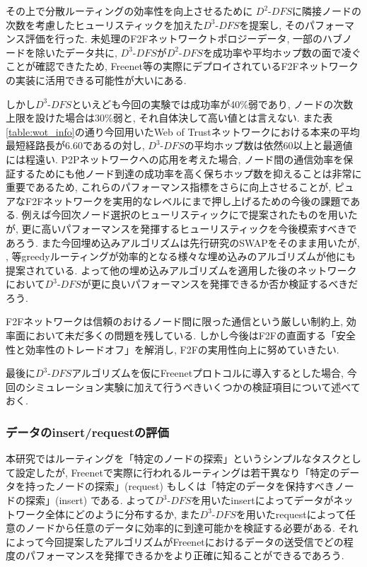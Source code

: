 \documentclass[dvipdfmx]{ampbt}
\begin{document}
その上で分散ルーティングの効率性を向上させるために $D^2$-$DFS$に隣接ノードの次数を考慮したヒューリスティックを加えた$D^3$-$DFS$を提案し, そのパフォーマンス評価を行った. 未処理のF2Fネットワークトポロジーデータ, 一部のハブノードを除いたデータ共に, $D^3$-$DFS$が$D^2$-$DFS$を成功率や平均ホップ数の面で凌ぐことが確認できたため, Freenet等の実際にデプロイされているF2Fネットワークの実装に活用できる可能性が大いにある. 

しかし$D^3$-$DFS$といえども今回の実験では成功率が40\%弱であり, ノードの次数上限を設けた場合は30\%弱と, それ自体決して高い値とは言えない. また表\ref{table:wot_info}の通り今回用いたWeb of Trustネットワークにおける本来の平均最短経路長が6.60であるの対し, $D^3$-$DFS$の平均ホップ数は依然60以上と最適値には程遠い. P2Pネットワークへの応用を考えた場合, ノード間の通信効率を保証するためにも他ノード到達の成功率を高く保ちホップ数を抑えることは非常に重要であるため, これらのパフォーマンス指標をさらに向上させることが, ピュアなF2Fネットワークを実用的なレベルにまで押し上げるための今後の課題である. 例えば今回次ノード選択のヒューリスティックに\cite{simsek2008navigating}で提案されたものを用いたが, 更に高いパフォーマンスを発揮するヒューリスティックを今後模索すべきであろう. また今回埋め込みアルゴリズムは先行研究のSWAPをそのまま用いたが, \cite{roos2017balanced}, \cite{boguna2010sustaining}等greedyルーティングが効率的となる様々な埋め込みのアルゴリズムが他にも提案されている. よって他の埋め込みアルゴリズムを適用した後のネットワークにおいて$D^3$-$DFS$が更に良いパフォーマンスを発揮できるか否か検証するべきだろう.

F2Fネットワークは信頼のおけるノード間に限った通信という厳しい制約上, 効率面において未だ多くの問題を残している. しかし今後はF2Fの直面する「安全性と効率性のトレードオフ」を解消し, F2Fの実用性向上に努めていきたい. 

最後に$D^3$-$DFS$アルゴリズムを仮にFreenetプロトコルに導入するとした場合, 今回のシミュレーション実験に加えて行うべきいくつかの検証項目について述べておく.

\subsubsection*{データのinsert/requestの評価}
本研究ではルーティングを「特定のノードの探索」というシンプルなタスクとして設定したが, Freenetで実際に行われるルーティングは若干異なり「特定のデータを持ったノードの探索」(request) もしくは「特定のデータを保持すべきノードの探索」(insert) である. よって$D^3$-$DFS$を用いたinsertによってデータがネットワーク全体にどのように分布するか, また$D^3$-$DFS$を用いたrequestによって任意のノードから任意のデータに効率的に到達可能かを検証する必要がある. それによって今回提案したアルゴリズムがFreenetにおけるデータの送受信でどの程度のパフォーマンスを発揮できるかをより正確に知ることができるであろう. 
\end{document}
